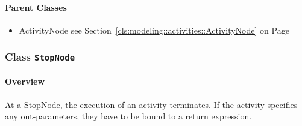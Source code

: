 	



\paragraph{Parent Classes}
\begin{itemize}
\item ActivityNode see Section~\ref{cls:modeling::activities::ActivityNode} on Page~\pageref{cls:modeling::activities::ActivityNode}\end{itemize}
\subsubsection{\Large{Class \bfseries \texttt{StopNode}\normalfont}}
\label{cls:modeling::activities::StopNode} 
\paragraph{Overview}

	
			
At a StopNode, the execution of an activity terminates. If the activity specifies any out-parameters, they have to be bound to a return expression.	
		
	


